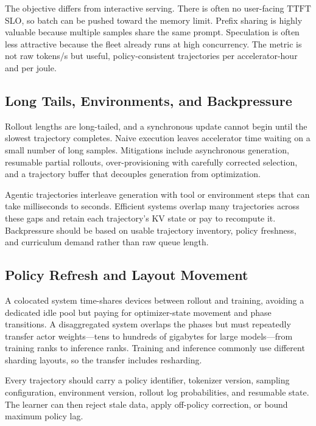 \documentclass[journal]{IEEEtran}
\newcommand{\TTFT}{\ensuremath{\mathrm{TTFT}}}
\begin{document}
The objective differs from interactive serving. There is often no user-facing \TTFT SLO, so batch can be pushed toward the memory limit. Prefix sharing is highly valuable because multiple samples share the same prompt. Speculation is often less attractive because the fleet already runs at high concurrency. The metric is not raw tokens/s but useful, policy-consistent trajectories per accelerator-hour and per joule.

\subsection{Long Tails, Environments, and Backpressure}
Rollout lengths are long-tailed, and a synchronous update cannot begin until the slowest trajectory completes. Naive execution leaves accelerator time waiting on a small number of long samples. Mitigations include asynchronous generation, resumable partial rollouts, over-provisioning with carefully corrected selection, and a trajectory buffer that decouples generation from optimization.

Agentic trajectories interleave generation with tool or environment steps that can take milliseconds to seconds. Efficient systems overlap many trajectories across these gaps and retain each trajectory's KV state or pay to recompute it. Backpressure should be based on usable trajectory inventory, policy freshness, and curriculum demand rather than raw queue length.

\subsection{Policy Refresh and Layout Movement}
A colocated system time-shares devices between rollout and training, avoiding a dedicated idle pool but paying for optimizer-state movement and phase transitions. A disaggregated system overlaps the phases but must repeatedly transfer actor weights---tens to hundreds of gigabytes for large models---from training ranks to inference ranks. Training and inference commonly use different sharding layouts, so the transfer includes resharding.

Every trajectory should carry a policy identifier, tokenizer version, sampling configuration, environment version, rollout log probabilities, and resumable state. The learner can then reject stale data, apply off-policy correction, or bound maximum policy lag.
\end{document}
